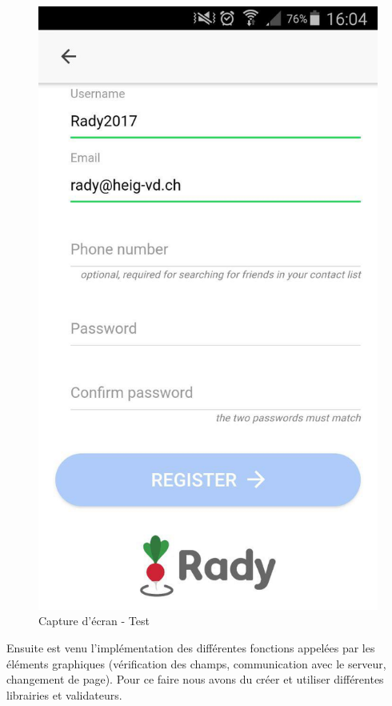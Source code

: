\documentclass[french]{article}
\begin{document}
\begin{figure}[H]
\begin{minipage}[c]{.46\linewidth}
			\includegraphics[scale=0.20]{../screenshot/screenshot-register.jpg}
			\caption{Capture d'écran - Test}
			\label{Capture d'écran - Test}
		\end{minipage}
		
	\end{figure} 	 
	
	\newpage
	
	Ensuite est venu l'implémentation des différentes fonctions appelées par les éléments graphiques (vérification des champs, communication avec le serveur, changement de page). Pour ce faire nous avons du créer et utiliser différentes librairies et validateurs.
	
\end{document}
